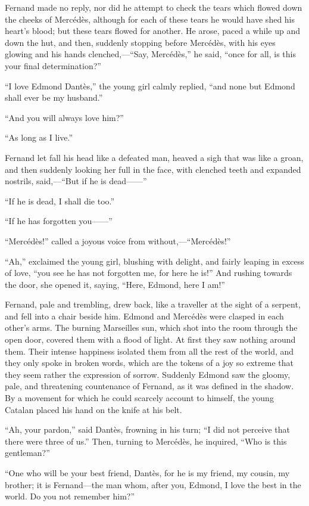 Fernand made no reply, nor did he attempt to check the tears which
flowed down the cheeks of Mercédès, although for each of these tears he
would have shed his heart’s blood; but these tears flowed for another.
He arose, paced a while up and down the hut, and then, suddenly
stopping before Mercédès, with his eyes glowing and his hands
clenched,—“Say, Mercédès,” he said, “once for all, is this your final
determination?”

“I love Edmond Dantès,” the young girl calmly replied, “and none but
Edmond shall ever be my husband.”

“And you will always love him?”

“As long as I live.”

Fernand let fall his head like a defeated man, heaved a sigh that was
like a groan, and then suddenly looking her full in the face, with
clenched teeth and expanded nostrils, said,—“But if he is dead——”

“If he is dead, I shall die too.”

“If he has forgotten you——”

“Mercédès!” called a joyous voice from without,—“Mercédès!”

“Ah,” exclaimed the young girl, blushing with delight, and fairly
leaping in excess of love, “you see he has not forgotten me, for here
he is!” And rushing towards the door, she opened it, saying, “Here,
Edmond, here I am!”

Fernand, pale and trembling, drew back, like a traveller at the sight
of a serpent, and fell into a chair beside him. Edmond and Mercédès
were clasped in each other’s arms. The burning Marseilles sun, which
shot into the room through the open door, covered them with a flood of
light. At first they saw nothing around them. Their intense happiness
isolated them from all the rest of the world, and they only spoke in
broken words, which are the tokens of a joy so extreme that they seem
rather the expression of sorrow. Suddenly Edmond saw the gloomy, pale,
and threatening countenance of Fernand, as it was defined in the
shadow. By a movement for which he could scarcely account to himself,
the young Catalan placed his hand on the knife at his belt.

“Ah, your pardon,” said Dantès, frowning in his turn; “I did not
perceive that there were three of us.” Then, turning to Mercédès, he
inquired, “Who is this gentleman?”

“One who will be your best friend, Dantès, for he is my friend, my
cousin, my brother; it is Fernand—the man whom, after you, Edmond, I
love the best in the world. Do you not remember him?”

